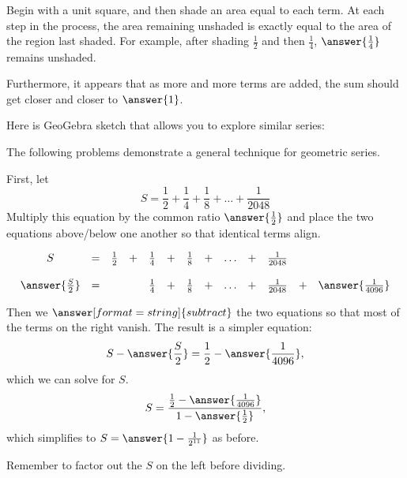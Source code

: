 \documentclass[nooutcomes]{ximera}
\begin{document}
\begin{problem}
\begin{problem}
\begin{problem}
Begin with a unit square, and then shade an area equal to each term.  At each step in the process, the area remaining unshaded is exactly equal to the area of the region last shaded.  For example, after shading $\frac{1}{2}$ and then $\frac{1}{4}$, 
$\answer{\frac{1}{4}}$ remains unshaded.  

Furthermore, it appears that as more and more terms are added, the sum should get closer and closer 
to $\answer{1}$.  

Here is GeoGebra sketch that allows you to explore similar series:  
\begin{center}
\end{center}

The following problems demonstrate a general technique for geometric series.  

\begin{problem}
First, let 
\[
S=\frac{1}{2}+\frac{1}{4}+\frac{1}{8}+\dots+\frac{1}{2048}
\]
Multiply this equation by the common ratio $\answer{\frac{1}{2}}$ and place the two equations above/below one another so that identical terms align.  

\[
\begin{array}{ccccccccccccc}
                     S &=& \frac{1}{2} &+& \frac{1}{4} &+& \frac{1}{8} &+& \dots &+& \frac{1}{2048} \\ \\
\answer{\frac{S}{2}} &=&                & & \frac{1}{4} &+& \frac{1}{8} &+& \dots &+& \frac{1}{2048} 
         &+& \answer{\frac{1}{4096}}
\end{array}
\]
\begin{problem}
Then we $\answer[format=string]{subtract}$ the two equations so that most of the terms on the right vanish.  The result is a simpler equation: 
\[
S - \answer{\frac{S}{2}} = \frac{1}{2} - \answer{\frac{1}{4096}},
\]
which we can solve for $S$.  
\[
S = \frac{\frac{1}{2} - \answer{\frac{1}{4096}}}{1-\answer{\frac{1}{2}}},
\]
which simplifies to $S=\answer{1-\frac{1}{2^{11}}}$ as before.  
\begin{hint}
Remember to factor out the $S$ on the left before dividing.  
\end{hint}
\end{problem}
\end{problem}

\end{problem}
\end{problem}
\end{problem}
\end{document}
